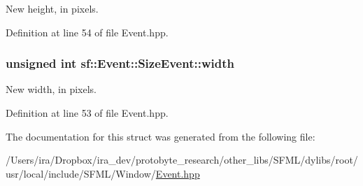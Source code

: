 New height, in pixels. 



Definition at line 54 of file Event.\-hpp.

\hypertarget{structsf_1_1_event_1_1_size_event_a20ea1b78c9bb1604432f8f0067bbfd94}{
\subsubsection[{width}]{\setlength{\rightskip}{0pt plus 5cm}unsigned int sf\-::\-Event\-::\-Size\-Event\-::width}}\label{structsf_1_1_event_1_1_size_event_a20ea1b78c9bb1604432f8f0067bbfd94}


New width, in pixels. 



Definition at line 53 of file Event.\-hpp.



The documentation for this struct was generated from the following file\-:\begin{DoxyCompactItemize}
\item 
/\-Users/ira/\-Dropbox/ira\-\_\-dev/protobyte\-\_\-research/other\-\_\-libs/\-S\-F\-M\-L/dylibs/root/usr/local/include/\-S\-F\-M\-L/\-Window/\hyperlink{_event_8hpp}{Event.\-hpp}\end{DoxyCompactItemize}
